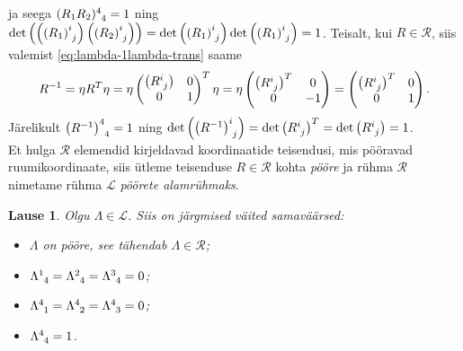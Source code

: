 \documentclass[a4paper,12pt]{article}
\theoremstyle{plain}
\newtheorem{lause}{Lause}[section]
\theoremstyle{definition}
\numberwithin{equation}{section}
\def\L{{\mathcal L}}
\begin{document}
ja seega $(R_1 R_2)\indices{^4_4} = 1$ ning $\det \left(\left(\left(R_1\right)\indices{^i_j}\right) \left(\left(R_2\right)\indices{^i_j}\right) \right) = \det \left(\left(R_1\right)\indices{^i_j}\right) \det \left(\left(R_1\right)\indices{^i_j}\right) = 1$.
Teisalt, kui $R \in \mathcal{R}$, siis valemist \ref{eq:lambda-1lambda-trans} saame
\begin{align*}
R^{-1} = \eta R^T \eta = \eta \begin{pmatrix}
\left(R\indices{^i_j}\right) & 0 \\ 
0 & 1 \\ \end{pmatrix}^T \eta = 
\eta \begin{pmatrix}
\left(R\indices{^i_j}\right)^T & 0 \\ 
0 & -1 \\ \end{pmatrix} = \begin{pmatrix}
\left(R\indices{^i_j}\right)^T & 0 \\ 
0 & 1 \\ \end{pmatrix}.
\end{align*}
Järelikult $\left(R^{-1}\right)\indices{^4_4} = 1$ ning $\det \left(\left(R^{-1}\right)\indices{^i_j}\right) = \det \left(R\indices{^i_j}\right)^T = \det \left(R\indices{^i_j}\right) = 1$. \\
Et hulga $\mathcal{R}$ elemendid kirjeldavad koordinaatide teisendusi, mis pööravad ruumikoordinaate, siis ütleme teisenduse $R \in \mathcal{R}$ kohta \emph{pööre} ja rühma $\mathcal{R}$ nimetame rühma $\L$ \emph{pöörete alamrühmaks}.

\begin{lause}
Olgu $\Lambda \in \L$. Siis on järgmised väited samaväärsed:
\begin{itemize}
\item[(i)] $\Lambda$ on pööre, see tähendab $\Lambda \in \mathcal{R}$;
\item[(ii)] $\Lambda\indices{^1_4} = \Lambda\indices{^2_4} = \Lambda\indices{^3_4} = 0$;
\item[(iii)] $\Lambda\indices{^4_1} = \Lambda\indices{^4_2} = \Lambda\indices{^4_3} = 0$;
\item[(iv)] $\Lambda\indices{^4_4} = 1$.
\end{itemize}
\end{lause}
\end{document}

